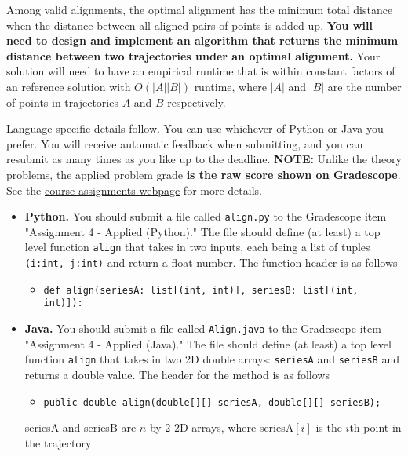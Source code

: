 \documentclass[11pt]{article}
\begin{document}
Among valid alignments, the optimal alignment has the minimum total distance when the distance between all aligned pairs of points is added up. \textbf{You will need to design and implement an algorithm that returns the minimum distance between two trajectories under an optimal alignment.} Your solution will need to have an empirical runtime that is within constant factors of an reference solution with $O(|A||B|)$ runtime, where $|A|$ and $|B|$ are the number of points in trajectories $A$ and $B$ respectively. 

Language-specific details follow. You can use whichever of Python or Java you prefer. You will receive automatic feedback when submitting, and you can resubmit as many times as you like up to the deadline. \textbf{NOTE:} Unlike the theory problems, the applied problem grade \textbf{is the raw score shown on Gradescope}. See the \href{https://sites.duke.edu/spring24compsci330/assignments/}{course assignments webpage} for more details. 

\begin{itemize}
	\item \textbf{Python.} You should submit a file called \texttt{align.py} to the Gradescope item "Assignment 4 - Applied (Python)." The file should define (at least) a top level function \texttt{align} that takes in two inputs, each being a list of tuples \texttt{(i:int, j:int)} and return a float number. The function header is as follows
    \begin{itemize}
        \item \texttt{def align(seriesA: list[(int, int)], seriesB: list[(int, int)]):}
    \end{itemize}
	
    \item \textbf{Java.} You should submit a file called \texttt{Align.java} to the Gradescope item "Assignment 4 - Applied (Java)." The file should define (at least) a top level function \texttt{align} that takes in two 2D double arrays: \texttt{seriesA} and \texttt{seriesB} and returns a double value. The header for the method is as follows
    \begin{itemize}
        \item \texttt{public double align(double[][] seriesA, double[][] seriesB);}
    \end{itemize}
    seriesA and seriesB are $n$ by 2 2D arrays, where seriesA$[i]$ is the $i$th point in the trajectory 
\end{itemize}
\end{document}
